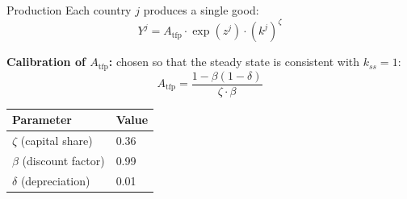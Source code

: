 \documentclass[aspectratio=169,11pt]{beamer}
\newcommand{\emphc}[1]{\textcolor{harvardcrimson}{#1}}
\begin{document}
\begin{frame}{Production}
Each country $j$ produces a single good:
\[
Y^j = A_{\text{tfp}} \cdot \exp(z^j) \cdot (k^j)^\zeta
\]

\vspace{0.3em}
\textbf{Calibration of $A_{\text{tfp}}$:} chosen so that the \emphc{steady state} is consistent with $k_{ss} = 1$:
\[
\boxed{A_{\text{tfp}} = \frac{1 - \beta(1-\delta)}{\zeta \cdot \beta}}
\]

\vspace{0.5em}
\begin{center}
\begin{tabular}{ll}
\toprule
\textbf{Parameter} & \textbf{Value} \\
\midrule
$\zeta$ (capital share) & 0.36 \\
$\beta$ (discount factor) & 0.99 \\
$\delta$ (depreciation) & 0.01 \\
\bottomrule
\end{tabular}
\end{center}
\end{frame}
\end{document}
